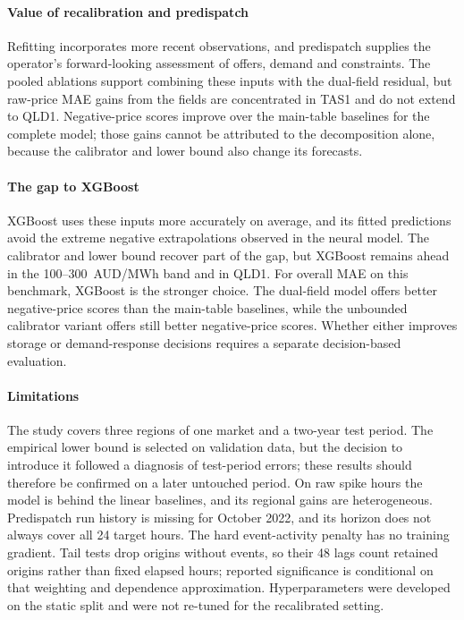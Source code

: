 \documentclass[preprint,12pt]{elsarticle}
\begin{document}
\paragraph{Value of recalibration and predispatch} Refitting incorporates more recent observations, and predispatch supplies the operator's forward-looking assessment of offers, demand and constraints. The pooled ablations support combining these inputs with the dual-field residual, but raw-price MAE gains from the fields are concentrated in TAS1 and do not extend to QLD1. Negative-price scores improve over the main-table baselines for the complete model; those gains cannot be attributed to the decomposition alone, because the calibrator and lower bound also change its forecasts.

\paragraph{The gap to XGBoost} XGBoost uses these inputs more accurately on average, and its fitted predictions avoid the extreme negative extrapolations observed in the neural model. The calibrator and lower bound recover part of the gap, but XGBoost remains ahead in the 100--300~AUD/MWh band and in QLD1. For overall MAE on this benchmark, XGBoost is the stronger choice. The dual-field model offers better negative-price scores than the main-table baselines, while the unbounded calibrator variant offers still better negative-price scores. Whether either improves storage or demand-response decisions requires a separate decision-based evaluation.

\paragraph{Limitations} The study covers three regions of one market and a two-year test period. The empirical lower bound is selected on validation data, but the decision to introduce it followed a diagnosis of test-period errors; these results should therefore be confirmed on a later untouched period. On raw spike hours the model is behind the linear baselines, and its regional gains are heterogeneous. Predispatch run history is missing for October 2022, and its horizon does not always cover all 24 target hours. The hard event-activity penalty has no training gradient. Tail tests drop origins without events, so their 48 lags count retained origins rather than fixed elapsed hours; reported significance is conditional on that weighting and dependence approximation. Hyperparameters were developed on the static split and were not re-tuned for the recalibrated setting.
\end{document}
